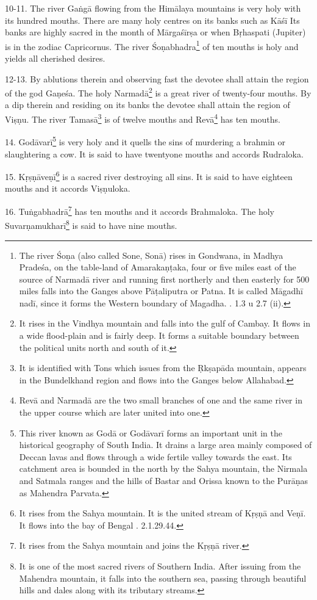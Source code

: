 10-11. The river Gaṅgā flowing from the Himālaya mountains is very holy with its
hundred mouths. There are many holy centres on its banks such as Kāśī \etc Its
banks are highly sacred in the month of Mārgaśīrṣa or when Bṛhaspati (Jupiter)
is in the zodiac Capricornus. The river Śoṇabhadra\footnote{The river Śoṇa (also
called Sone, Sonā) rises in Gondwana, in Madhya Pradeśa, on the table-land of
Amarakaṇṭaka, four or five miles east of the source of Narmadā river and running
first northerly and then easterly for 500 miles falls into the Ganges above
Pāṭaliputra or Patna. It is called Māgadhī nadī, since it forms the Western
boundary of Magadha. . 1.3 u 2.7 (ii).} of ten mouths is holy and yields
all cherished desires.

12-13. By ablutions therein and observing fast the devotee shall attain
the region of the god Gaṇeśa. The holy Narmadā\footnote{It rises in the Vindhya
mountain and falls into the gulf of Cambay. It flows in a wide flood-plain and
is fairly deep. It forms a suitable boundary between the political units north
and south of it.} is a great river of twenty-four mouths. By a dip therein and
residing on its banks the devotee shall attain the region of Viṣṇu. The river
Tamasā\footnote{It is identified with Tons which issues from the Ṛkṣapāda
mountain, appears in the Bundelkhand region and flows into the Ganges below
Allahabad.} is of twelve mouths and Revā\footnote{Revā and Narmadā are the two
small branches of one and the same river in the upper course which are later
united into one.} has ten mouths.

14. Godāvarī\footnote{This river known as Godā or Godāvarī forms an important
unit in the historical geography of South India. It drains a large area mainly
composed of Deccan lavas and flows through a wide fertile valley towards
the east. Its catchment area is bounded in the north by the Sahya mountain,
the Nirmala and Satmala ranges and the hills of Bastar and Orissa known to
the Purāṇas as Mahendra Parvata.} is very holy and it quells the sins of
murdering a brahmin or slaughtering a cow. It is said to have twentyone mouths
and accords Rudraloka.

15. Kṛṣṇāveṇī\footnote{It rises from the Sahya mountain. It is the united stream
of Kṛṣṇā and Veṇī. It flows into the bay of Bengal . 2.1.29.44.} is
a sacred river destroying all sins. It is said to have eighteen mouths and it
accords Viṣṇuloka.

16. Tuṅgabhadrā\footnote{It rises from the Sahya mountain and joins the Kṛṣṇā
river.} has ten mouths and it accords Brahmaloka. The holy
Suvarṇamukharī\footnote{It is one of the most sacred rivers of Southern India.
After issuing from the Mahendra mountain, it falls into the southern sea,
passing through beautiful hills and dales along with its tributary streams.} is
said to have nine mouths.

